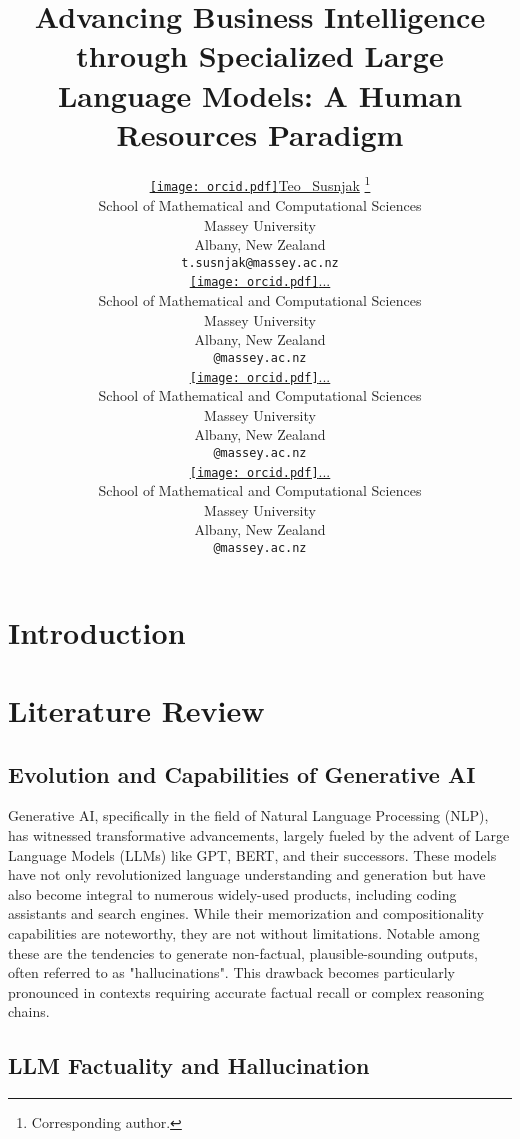 \documentclass{article}
\title{Advancing Business Intelligence through Specialized Large Language Models: A Human Resources Paradigm}
\author{ \href{https://orcid.org/0000-0001-9416-1435}{\texttt{[image: orcid.pdf]}\hspace{1mm}Teo ~Susnjak} \thanks{Corresponding author.} \\
	School of Mathematical and Computational Sciences\\
	Massey University\\
	Albany, New Zealand \\
	\texttt{t.susnjak@massey.ac.nz} \\
	\And
	\href{https://orcid.org/0000-0000-0000-0000}{\texttt{[image: orcid.pdf]}\hspace{1mm}...} \\
	School of Mathematical and Computational Sciences\\
	Massey University\\
	Albany, New Zealand \\
	\texttt{@massey.ac.nz} \\
	\And
	\href{https://orcid.org/0000-0000-0000-0000}{\texttt{[image: orcid.pdf]}\hspace{1mm}...} \\
	School of Mathematical and Computational Sciences\\
	Massey University\\
	Albany, New Zealand \\
	\texttt{@massey.ac.nz} \\
	\And
	\href{https://orcid.org/0000-0000-0000-0000}{\texttt{[image: orcid.pdf]}\hspace{1mm}...}\\
	School of Mathematical and Computational Sciences\\
	Massey University\\
	Albany, New Zealand \\
	\texttt{@massey.ac.nz} \\
}
\begin{document}
\maketitle

\begin{abstract}
	\lipsum[1]
\end{abstract}




\section{Introduction}

\section{Literature Review}

\subsection{Evolution and Capabilities of Generative AI}
Generative AI, specifically in the field of Natural Language Processing (NLP), has witnessed transformative advancements, largely fueled by the advent of Large Language Models (LLMs) like GPT, BERT, and their successors. These models have not only revolutionized language understanding and generation but have also become integral to numerous widely-used products, including coding assistants and search engines. While their memorization and compositionality capabilities are noteworthy, they are not without limitations. Notable among these are the tendencies to generate non-factual, plausible-sounding outputs, often referred to as "hallucinations". This drawback becomes particularly pronounced in contexts requiring accurate factual recall or complex reasoning chains.

\subsection{LLM Factuality and Hallucination}
\end{document}
